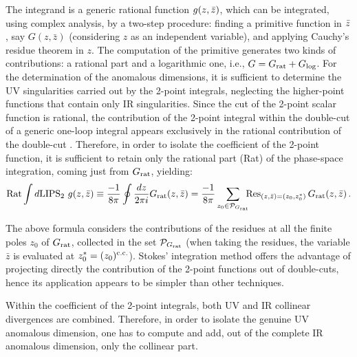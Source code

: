 The integrand is a generic rational function $g(z,\bar{z})$, which can be integrated, using complex analysis, by a two-step procedure: finding a primitive function in $\bar{z}$, say $G(z,{\bar z})$ (considering $z$ as an independent variable), and applying Cauchy's residue theorem in $z$.
 The computation of the primitive generates two kinds of contributions: a rational part and a logarithmic one, i.e., 
 $G = G_{\rm rat} + G_{\log}$. 
 For the determination of the anomalous dimensions,
 it is sufficient to determine the UV singularities carried out by the 2-point integrals, neglecting the higher-point functions that contain only IR singularities.
 Since the cut of the 2-point scalar function is rational, the contribution of the 2-point integral within the double-cut of a generic one-loop integral appears exclusively in the rational contribution of the double-cut \cite{Mastrolia:2009dr}. 
 Therefore, in order to isolate the coefficient of the 2-point function, it is sufficient to retain only the rational part (Rat) of the phase-space integration, coming just from $G_{\rm rat}$, yielding:
    \begin{equation}
        {\rm Rat}\int d{\rm LIPS}_2 \ g(z,\zb)
        \equiv 
         \frac{-1}{8 \pi} 
         \oint \frac{dz }{ 2 \pi i} 
         G_{\rm rat}(z,{\bar z}) 
         =
         \frac{-1}{8 \pi} 
         \sum_{z_0\in {\cal P}_{G_{\rm rat}}} 
         \!\!\!
         \Res_{(z,\zb)=(z_0,z_0^*)} G_{\rm rat}(z,\zb)\, . 
    \end{equation}
  
The above formula considers the contributions of the residues at all the finite poles $z_0$ of $G_{\rm rat}$, collected in the set ${\cal P}_{G_{\rm rat}}$  
(when taking the residues, the variable ${\bar z}$  is evaluated at $z_0^* = (z_0)^{\rm c.c.}$). 
Stokes' integration method offers the advantage of projecting directly the contribution of the 2-point functions out of double-cuts, 
hence its application appears to be simpler than other techniques. 

Within the coefficient of the 2-point integrals, both UV and IR collinear divergences are combined.
Therefore, in order to isolate the genuine UV anomalous dimension,
one has to compute and add,
out of the complete IR anomalous dimension, only the collinear part.
